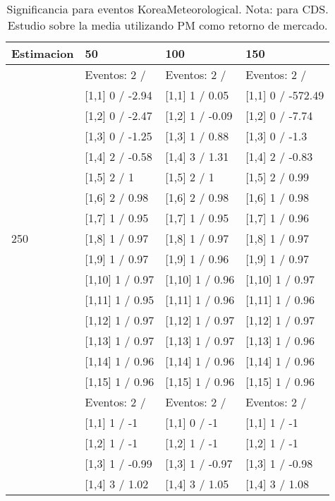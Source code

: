 \begin{table}

\caption{Significancia para eventos KoreaMeteorological. Nota: para CDS. Estudio sobre la media utilizando PM como retorno de mercado.}
\centering
\begin{tabular}[t]{llll}
\toprule
Estimacion & 50 & 100 & 150\\
\midrule
 & Eventos:  2 / & Eventos:  2 / & Eventos:  2 /\\
 & {}[1,1] 0  / -2.94 & {}[1,1] 1  / 0.05 & {}[1,1] 0  / -572.49\\
 & {}[1,2] 0  / -2.47 & {}[1,2] 1  / -0.09 & {}[1,2] 0  / -7.74\\
 & {}[1,3] 0  / -1.25 & {}[1,3] 1  / 0.88 & {}[1,3] 0  / -1.3\\
 & {}[1,4] 2  / -0.58 & {}[1,4] 3  / 1.31 & {}[1,4] 2  / -0.83\\
\addlinespace
 & {}[1,5] 2  / 1 & {}[1,5] 2  / 1 & {}[1,5] 2  / 0.99\\
 & {}[1,6] 2  / 0.98 & {}[1,6] 2  / 0.98 & {}[1,6] 1  / 0.98\\
 & {}[1,7] 1  / 0.95 & {}[1,7] 1  / 0.95 & {}[1,7] 1  / 0.96\\
250 & {}[1,8] 1  / 0.97 & {}[1,8] 1  / 0.97 & {}[1,8] 1  / 0.97\\
 & {}[1,9] 1  / 0.97 & {}[1,9] 1  / 0.96 & {}[1,9] 1  / 0.97\\
\addlinespace
 & {}[1,10] 1  / 0.97 & {}[1,10] 1  / 0.96 & {}[1,10] 1  / 0.97\\
 & {}[1,11] 1  / 0.95 & {}[1,11] 1  / 0.96 & {}[1,11] 1  / 0.96\\
 & {}[1,12] 1  / 0.97 & {}[1,12] 1  / 0.97 & {}[1,12] 1  / 0.97\\
 & {}[1,13] 1  / 0.97 & {}[1,13] 1  / 0.97 & {}[1,13] 1  / 0.96\\
 & {}[1,14] 1  / 0.96 & {}[1,14] 1  / 0.96 & {}[1,14] 1  / 0.96\\
\addlinespace
 & {}[1,15] 1  / 0.96 & {}[1,15] 1  / 0.96 & {}[1,15] 1  / 0.96\\
 & Eventos:  2 / & Eventos:  2 / & Eventos:  2 /\\
 & {}[1,1] 1  / -1 & {}[1,1] 0  / -1 & {}[1,1] 1  / -1\\
 & {}[1,2] 1  / -1 & {}[1,2] 1  / -1 & {}[1,2] 1  / -1\\
 & {}[1,3] 1  / -0.99 & {}[1,3] 1  / -0.97 & {}[1,3] 1  / -0.98\\
\addlinespace
 & {}[1,4] 3  / 1.02 & {}[1,4] 3  / 1.05 & {}[1,4] 3  / 1.08\\

\end{tabular}
\end{table}
